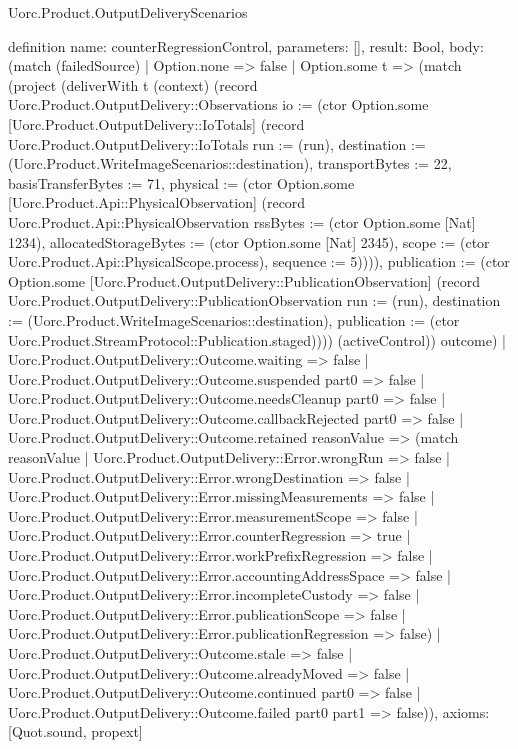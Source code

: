 \begin{lexlean}{Uorc.Product.OutputDeliveryScenarios}
\begin{semanticmodule}
definition{
  name: counterRegressionControl,
  parameters: [],
  result: Bool,
  body: (match (failedSource)
    | Option.none => false
    | Option.some t => (match (project (deliverWith t (context) (record Uorc.Product.OutputDelivery::Observations {io := (ctor Option.some [Uorc.Product.OutputDelivery::IoTotals] (record Uorc.Product.OutputDelivery::IoTotals {run := (run), destination := (Uorc.Product.WriteImageScenarios::destination), transportBytes := 22, basisTransferBytes := 71, physical := (ctor Option.some [Uorc.Product.Api::PhysicalObservation] (record Uorc.Product.Api::PhysicalObservation {rssBytes := (ctor Option.some [Nat] 1234), allocatedStorageBytes := (ctor Option.some [Nat] 2345), scope := (ctor Uorc.Product.Api::PhysicalScope.process), sequence := 5}))})), publication := (ctor Option.some [Uorc.Product.OutputDelivery::PublicationObservation] (record Uorc.Product.OutputDelivery::PublicationObservation {run := (run), destination := (Uorc.Product.WriteImageScenarios::destination), publication := (ctor Uorc.Product.StreamProtocol::Publication.staged)}))}) (activeControl)) outcome)
      | Uorc.Product.OutputDelivery::Outcome.waiting => false
      | Uorc.Product.OutputDelivery::Outcome.suspended part0 => false
      | Uorc.Product.OutputDelivery::Outcome.needsCleanup part0 => false
      | Uorc.Product.OutputDelivery::Outcome.callbackRejected part0 => false
      | Uorc.Product.OutputDelivery::Outcome.retained reasonValue => (match reasonValue
        | Uorc.Product.OutputDelivery::Error.wrongRun => false
        | Uorc.Product.OutputDelivery::Error.wrongDestination => false
        | Uorc.Product.OutputDelivery::Error.missingMeasurements => false
        | Uorc.Product.OutputDelivery::Error.measurementScope => false
        | Uorc.Product.OutputDelivery::Error.counterRegression => true
        | Uorc.Product.OutputDelivery::Error.workPrefixRegression => false
        | Uorc.Product.OutputDelivery::Error.accountingAddressSpace => false
        | Uorc.Product.OutputDelivery::Error.incompleteCustody => false
        | Uorc.Product.OutputDelivery::Error.publicationScope => false
        | Uorc.Product.OutputDelivery::Error.publicationRegression => false)
      | Uorc.Product.OutputDelivery::Outcome.stale => false
      | Uorc.Product.OutputDelivery::Outcome.alreadyMoved => false
      | Uorc.Product.OutputDelivery::Outcome.continued part0 => false
      | Uorc.Product.OutputDelivery::Outcome.failed part0 part1 => false)),
  axioms: [Quot.sound, propext]
}


\end{semanticmodule}
\end{lexlean}
